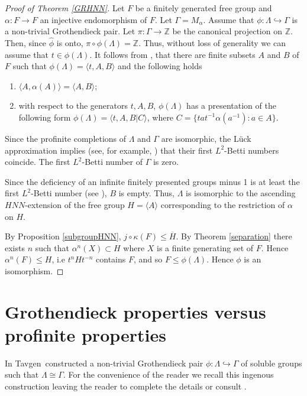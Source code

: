 \documentclass{amsart}
\theoremstyle{definition}
\theoremstyle{remark}
\newcommand{\Z}{\mathbb{Z}}
\begin{document}
  \begin{proof}[Proof of Theorem \ref{GRHNN}]  Let $F$ be a finitely generated free group and $\alpha:F\to F$ an injective endomorphism of $F$.  Let $\Gamma=M_\alpha$. Assume that $\phi:\Lambda \hookrightarrow \Gamma$ is a non-trivial Grothendieck pair.  
  Let $\pi:\Gamma\to \Z$ be the canonical projection on $\Z$. Then, since $\widehat \phi$  is onto,  $\pi\circ \phi(\Lambda)=\Z$. Thus, without loss of generality we can assume that $t\in \phi(\Lambda)$.
  It follows from \cite[Proposition 2.3]{FH99}, that there are finite subsets $A$ and  $B$   of $F$ such that  $\phi(\Lambda)=\langle t, A, B\rangle$ and the following holds \begin{enumerate}
  \item $\langle A,\alpha(A)\rangle =\langle A,B\rangle$;
\item with respect to the generators $t, A, B$,  $\phi(\Lambda)$ has a presentation of   the following form $\phi(\Lambda)=\langle t, A, B| C\rangle$, where 
  $C=\{tat^{-1}\alpha(a^{-1}):a\in A\}$.
\end{enumerate}
Since the profinite completions of $\Lambda$ and $\Gamma$ are isomorphic, the L\"uck approximation \cite{Lu94} implies (see, for example, \cite[Corollary 6.4]{ReAndrews}) that  their first  $L^2$-Betti numbers coincide. The first $L^2$-Betti number of $\Gamma$ is zero. 

Since the deficiency of an infinite finitely presented groups minus 1 is at least the first $L^2$-Betti number (see \cite[theorem 3.21]{Ka19}),  $B$ is empty. Thus, $\Lambda$ is isomorphic to the ascending $HNN$-extension of the free group $H=\langle A\rangle$ corresponding to the restriction of $\alpha$ on $H$.  

By Proposition \ref{subgroupHNN},  $j\circ \kappa(F)\le \overline H$. By Theorem \ref{separation} there exists $n$ such that $\alpha^n(X)\subset H$  where $X$ is a finite generating set of $F$. Hence $\alpha^n(F)\le H$, i.e $t^{n}Ht^{-n}$ contains $F$, and so $F\le \phi(\Lambda)$.  Hence $\phi$ is an isomorphism.
 \end{proof}
 \section{Grothendieck properties versus profinite properties} 
 \label{profinite}

In \cite{Ta87} Tavgen\textquotesingle\  constructed a non-trivial  Grothendieck pair $\phi:\Lambda \hookrightarrow \Gamma$ of soluble groups such that $\Lambda\cong \Gamma$. For the convenience of the reader we recall   this ingenous construction leaving the reader to complete the details or consult \cite{Ta87}.
\end{document}
